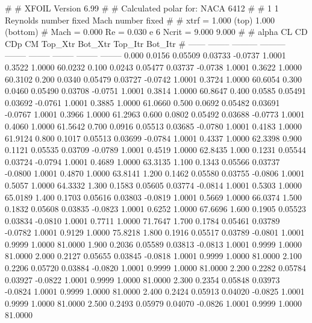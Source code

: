 #  
#       XFOIL         Version 6.99
#  
# Calculated polar for: NACA 6412                                       
#  
# 1 1 Reynolds number fixed          Mach number fixed         
#  
# xtrf =   1.000 (top)        1.000 (bottom)  
# Mach =   0.000     Re =     0.030 e 6     Ncrit =   9.000  9.000
#  
#   alpha    CL        CD       CDp       CM     Top_Xtr  Bot_Xtr  Top_Itr  Bot_Itr
#  ------ -------- --------- --------- -------- -------- -------- -------- --------
   0.000   0.0156   0.05509   0.03733  -0.0737   1.0001   0.3522   1.0000  60.0232
   0.100   0.0243   0.05477   0.03737  -0.0738   1.0001   0.3622   1.0000  60.3102
   0.200   0.0340   0.05479   0.03727  -0.0742   1.0001   0.3724   1.0000  60.6054
   0.300   0.0460   0.05490   0.03708  -0.0751   1.0001   0.3814   1.0000  60.8647
   0.400   0.0585   0.05491   0.03692  -0.0761   1.0001   0.3885   1.0000  61.0660
   0.500   0.0692   0.05482   0.03691  -0.0767   1.0001   0.3966   1.0000  61.2963
   0.600   0.0802   0.05492   0.03688  -0.0773   1.0001   0.4060   1.0000  61.5642
   0.700   0.0916   0.05513   0.03685  -0.0780   1.0001   0.4183   1.0000  61.9124
   0.800   0.1017   0.05513   0.03699  -0.0784   1.0001   0.4337   1.0000  62.3398
   0.900   0.1121   0.05535   0.03709  -0.0789   1.0001   0.4519   1.0000  62.8435
   1.000   0.1231   0.05544   0.03724  -0.0794   1.0001   0.4689   1.0000  63.3135
   1.100   0.1343   0.05566   0.03737  -0.0800   1.0001   0.4870   1.0000  63.8141
   1.200   0.1462   0.05580   0.03755  -0.0806   1.0001   0.5057   1.0000  64.3332
   1.300   0.1583   0.05605   0.03774  -0.0814   1.0001   0.5303   1.0000  65.0189
   1.400   0.1703   0.05616   0.03803  -0.0819   1.0001   0.5669   1.0000  66.0374
   1.500   0.1832   0.05608   0.03835  -0.0823   1.0001   0.6252   1.0000  67.6696
   1.600   0.1905   0.05523   0.03834  -0.0810   1.0001   0.7711   1.0000  71.7647
   1.700   0.1784   0.05461   0.03789  -0.0782   1.0001   0.9129   1.0000  75.8218
   1.800   0.1916   0.05517   0.03789  -0.0801   1.0001   0.9999   1.0000  81.0000
   1.900   0.2036   0.05589   0.03813  -0.0813   1.0001   0.9999   1.0000  81.0000
   2.000   0.2127   0.05655   0.03845  -0.0818   1.0001   0.9999   1.0000  81.0000
   2.100   0.2206   0.05720   0.03884  -0.0820   1.0001   0.9999   1.0000  81.0000
   2.200   0.2282   0.05784   0.03927  -0.0822   1.0001   0.9999   1.0000  81.0000
   2.300   0.2354   0.05848   0.03973  -0.0824   1.0001   0.9999   1.0000  81.0000
   2.400   0.2424   0.05913   0.04020  -0.0825   1.0001   0.9999   1.0000  81.0000
   2.500   0.2493   0.05979   0.04070  -0.0826   1.0001   0.9999   1.0000  81.0000
